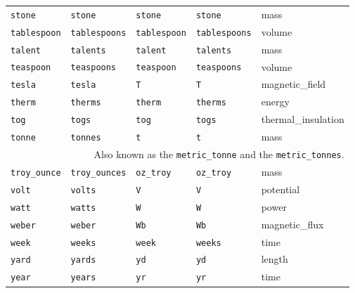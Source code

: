 \begin{landscape}
\begin{center}
\begin{longtable}{|lllll|}
{\tt\footnotesize stone} & {\tt\footnotesize stone} & {\tt\footnotesize stone} & {\tt\footnotesize stone} & mass \\
{\tt\footnotesize tablespoon} & {\tt\footnotesize tablespoons} & {\tt\footnotesize tablespoon} & {\tt\footnotesize tablespoons} & volume \\
{\tt\footnotesize talent} & {\tt\footnotesize talents} & {\tt\footnotesize talent} & {\tt\footnotesize talents} & mass \\
{\tt\footnotesize teaspoon} & {\tt\footnotesize teaspoons} & {\tt\footnotesize teaspoon} & {\tt\footnotesize teaspoons} & volume \\
{\tt\footnotesize tesla} & {\tt\footnotesize tesla} & {\tt\footnotesize T} & {\tt\footnotesize T} & magnetic\_field \\
{\tt\footnotesize therm} & {\tt\footnotesize therms} & {\tt\footnotesize therm} & {\tt\footnotesize therms} & energy \\
{\tt\footnotesize tog} & {\tt\footnotesize togs} & {\tt\footnotesize tog} & {\tt\footnotesize togs} & thermal\_insulation \\
{\tt\footnotesize tonne} & {\tt\footnotesize tonnes} & {\tt\footnotesize t} & {\tt\footnotesize t} & mass \\
\multicolumn{5}{|r|}{\footnotesize Also known as the {\tt metric\_tonne} and the {\tt metric\_tonnes}.} \\
{\tt\footnotesize troy\_ounce} & {\tt\footnotesize troy\_ounces} & {\tt\footnotesize oz\_troy} & {\tt\footnotesize oz\_troy} & mass \\
{\tt\footnotesize volt} & {\tt\footnotesize volts} & {\tt\footnotesize V} & {\tt\footnotesize V} & potential \\
{\tt\footnotesize watt} & {\tt\footnotesize watts} & {\tt\footnotesize W} & {\tt\footnotesize W} & power \\
{\tt\footnotesize weber} & {\tt\footnotesize weber} & {\tt\footnotesize Wb} & {\tt\footnotesize Wb} & magnetic\_flux \\
{\tt\footnotesize week} & {\tt\footnotesize weeks} & {\tt\footnotesize week} & {\tt\footnotesize weeks} & time \\
{\tt\footnotesize yard} & {\tt\footnotesize yards} & {\tt\footnotesize yd} & {\tt\footnotesize yd} & length \\
{\tt\footnotesize year} & {\tt\footnotesize years} & {\tt\footnotesize yr} & {\tt\footnotesize yr} & time \\
\end{longtable}
\end{center}
\end{landscape}

